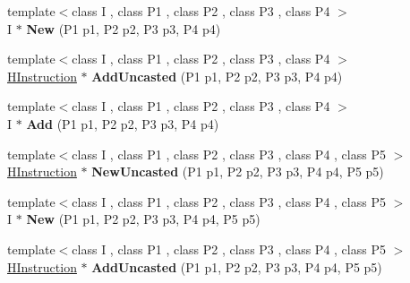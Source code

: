 \begin{DoxyCompactItemize}
\item 
{\footnotesize template$<$class I , class P1 , class P2 , class P3 , class P4 $>$ }\\I $\ast$ {\bfseries New} (P1 p1, P2 p2, P3 p3, P4 p4)\hypertarget{classv8_1_1internal_1_1_h_graph_builder_ad7f2e521d1197f68aa812228b8bac315}{}\label{classv8_1_1internal_1_1_h_graph_builder_ad7f2e521d1197f68aa812228b8bac315}

\item 
{\footnotesize template$<$class I , class P1 , class P2 , class P3 , class P4 $>$ }\\\hyperlink{classv8_1_1internal_1_1_h_instruction}{H\+Instruction} $\ast$ {\bfseries Add\+Uncasted} (P1 p1, P2 p2, P3 p3, P4 p4)\hypertarget{classv8_1_1internal_1_1_h_graph_builder_a7e66f56c6ee19aada6a057d977bbe84b}{}\label{classv8_1_1internal_1_1_h_graph_builder_a7e66f56c6ee19aada6a057d977bbe84b}

\item 
{\footnotesize template$<$class I , class P1 , class P2 , class P3 , class P4 $>$ }\\I $\ast$ {\bfseries Add} (P1 p1, P2 p2, P3 p3, P4 p4)\hypertarget{classv8_1_1internal_1_1_h_graph_builder_a9dcd4e4fc37ede14981a0529dd443af3}{}\label{classv8_1_1internal_1_1_h_graph_builder_a9dcd4e4fc37ede14981a0529dd443af3}

\item 
{\footnotesize template$<$class I , class P1 , class P2 , class P3 , class P4 , class P5 $>$ }\\\hyperlink{classv8_1_1internal_1_1_h_instruction}{H\+Instruction} $\ast$ {\bfseries New\+Uncasted} (P1 p1, P2 p2, P3 p3, P4 p4, P5 p5)\hypertarget{classv8_1_1internal_1_1_h_graph_builder_a6c505a1dd7dc3477154ccdfd969714bf}{}\label{classv8_1_1internal_1_1_h_graph_builder_a6c505a1dd7dc3477154ccdfd969714bf}

\item 
{\footnotesize template$<$class I , class P1 , class P2 , class P3 , class P4 , class P5 $>$ }\\I $\ast$ {\bfseries New} (P1 p1, P2 p2, P3 p3, P4 p4, P5 p5)\hypertarget{classv8_1_1internal_1_1_h_graph_builder_a7295038551d619d0679f3343b3b787ce}{}\label{classv8_1_1internal_1_1_h_graph_builder_a7295038551d619d0679f3343b3b787ce}

\item 
{\footnotesize template$<$class I , class P1 , class P2 , class P3 , class P4 , class P5 $>$ }\\\hyperlink{classv8_1_1internal_1_1_h_instruction}{H\+Instruction} $\ast$ {\bfseries Add\+Uncasted} (P1 p1, P2 p2, P3 p3, P4 p4, P5 p5)\hypertarget{classv8_1_1internal_1_1_h_graph_builder_a0c4b81ac0c9e8a6a57d633e5b0eec946}{}\label{classv8_1_1internal_1_1_h_graph_builder_a0c4b81ac0c9e8a6a57d633e5b0eec946}


\end{DoxyCompactItemize}
